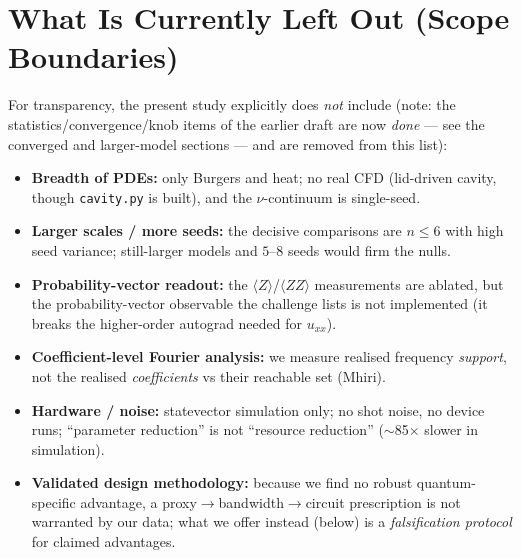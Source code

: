 \documentclass[11pt]{article}
\begin{document}
\section{What Is Currently Left Out (Scope Boundaries)}
\label{sec:leftout}
For transparency, the present study explicitly does \emph{not} include (note: the
statistics/convergence/knob items of the earlier draft are now \emph{done} --- see the
converged and larger-model sections --- and are removed from this list):
\begin{itemize}[nosep]
  \item \textbf{Breadth of PDEs:} only Burgers and heat; no real CFD (lid-driven
  cavity, though \texttt{cavity.py} is built), and the $\nu$-continuum is single-seed.
  \item \textbf{Larger scales / more seeds:} the decisive comparisons are $n\!\le\!6$
  with high seed variance; still-larger models and $5$--$8$ seeds would firm the nulls.
  \item \textbf{Probability-vector readout:} the $\langle Z\rangle$/$\langle ZZ\rangle$
  measurements are ablated, but the probability-vector observable the challenge lists
  is not implemented (it breaks the higher-order autograd needed for $u_{xx}$).
  \item \textbf{Coefficient-level Fourier analysis:} we measure realised frequency
  \emph{support}, not the realised \emph{coefficients} vs their reachable set (Mhiri).
  \item \textbf{Hardware / noise:} statevector simulation only; no shot noise, no
  device runs; ``parameter reduction'' is not ``resource reduction''
  ($\sim$85$\times$ slower in simulation).
  \item \textbf{Validated design methodology:} because we find no robust
  quantum-specific advantage, a proxy$\to$bandwidth$\to$circuit prescription is not
  warranted by our data; what we offer instead (below) is a \emph{falsification
  protocol} for claimed advantages.
\end{itemize}

\end{document}
